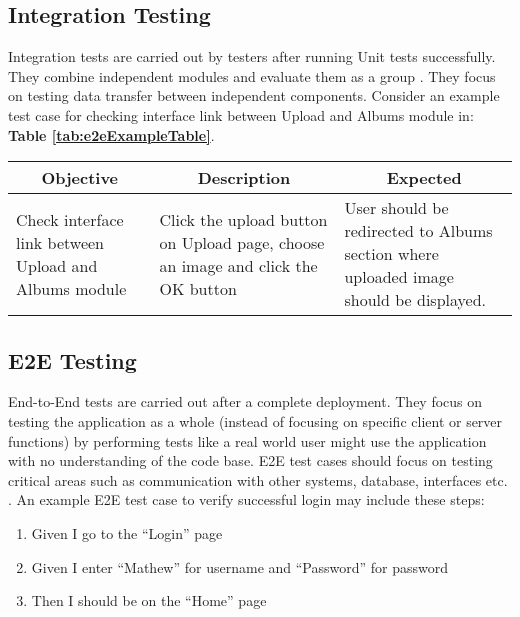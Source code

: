 \subsection{Integration Testing}
\label{subsec:unit-testing}

Integration tests are carried out by testers after running Unit tests successfully. They combine independent modules and evaluate them as a group \cite{search-software-quality}. They focus on testing data transfer between independent components. Consider an example test case for checking interface link between Upload and Albums module in:  \textbf{Table \ref{tab:e2eExampleTable}}.

\begin{center}
\begin{tabular}{ |p{4cm}|p{4cm}|p{4.5cm}|  }

 \hline
 	\multicolumn{1}{|c|}{Objective} &
 	\multicolumn{1}{|c|}{Description} &
 	\multicolumn{1}{|c|}{Expected}  \\
 \hline
 	Check interface link between Upload and Albums module & Click the upload button on Upload page, choose an image and click the OK button & User should be redirected to Albums section where uploaded image should be displayed. \\
 \hline

\end{tabular}
\label{tab:e2eExampleTable}
\end{center}

\subsection{E2E Testing}
\label{subsec:e2e-testing}

End-to-End tests are carried out after a complete deployment. They focus on testing the application as a whole (instead of focusing on specific client or server functions) by performing tests like a real world user might use the application with no understanding of the code base. E2E test cases should focus on testing critical areas such as communication with other systems, database, interfaces etc. \cite{tutorialspoint}. An example E2E test case to verify successful login may include these steps:

\begin{enumerate}
	\item Given I go to the “Login” page
    \item Given I enter “Mathew” for username and “Password” for password
    \item Then I should be on the “Home” page
\end{enumerate}

